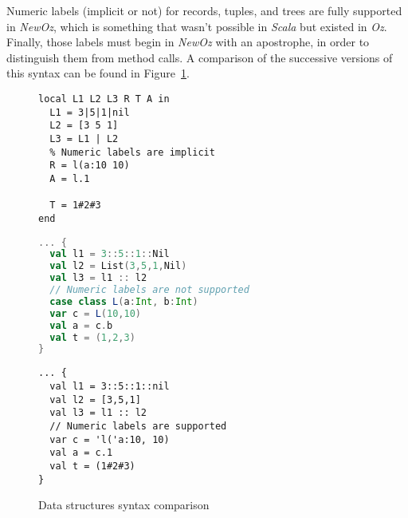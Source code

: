 Numeric labels (implicit or not) for records, tuples, and trees are fully supported in \textit{NewOz}, which is something that wasn't possible in \textit{Scala} but existed in \textit{Oz}.
Finally, those labels must begin in \textit{NewOz} with an apostrophe, in order to distinguish them from method calls.
A comparison of the successive versions of this syntax can be found in Figure~\ref{fig:code-comp-data}.
\begin{figure}[t]
    \noindent\begin{minipage}{.49\textwidth}
        \begin{lstlisting}[title={Oz},language=oz]
local L1 L2 L3 R T A in
  L1 = 3|5|1|nil
  L2 = [3 5 1]
  L3 = L1 | L2
  % Numeric labels are implicit
  R = l(a:10 10)
  A = l.1

  T = 1#2#3
end
        \end{lstlisting}
    \end{minipage}
    \hfill
    \noindent\begin{minipage}{.49\textwidth}
        \begin{lstlisting}[title={Scala/Ozma},language=scala]
... {
  val l1 = 3::5::1::Nil
  val l2 = List(3,5,1,Nil)
  val l3 = l1 :: l2
  // Numeric labels are not supported
  case class L(a:Int, b:Int)
  var c = L(10,10)
  val a = c.b
  val t = (1,2,3)
}
        \end{lstlisting}
    \end{minipage}
    \begin{center}
    \noindent\begin{minipage}{.89\textwidth}
        \begin{lstlisting}[title={NewOz 2020/2021},language=newoz]
... {
  val l1 = 3::5::1::nil
  val l2 = [3,5,1]
  val l3 = l1 :: l2
  // Numeric labels are supported
  var c = 'l('a:10, 10)
  val a = c.1
  val t = (1#2#3)
}
        \end{lstlisting}
    \end{minipage}
    \end{center}
\caption{Data structures syntax comparison}
\label{fig:code-comp-data}
\end{figure}

